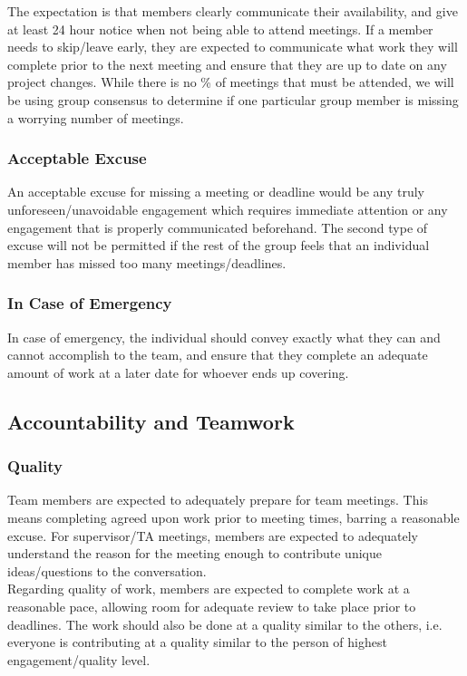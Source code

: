 \documentclass{article}
\begin{document}
The expectation is that members clearly communicate their availability,
and give at least 24 hour notice when not being able to attend meetings.
If a member needs to skip/leave early, they are expected to communicate 
what work they will complete prior to the next meeting and ensure that
they are up to date on any project changes. While there is no \% of
meetings that must be attended, we will be using group consensus to
determine if one particular group member is missing a worrying number
of meetings.

\subsubsection*{Acceptable Excuse}

An acceptable excuse for missing a meeting or deadline would be any truly
unforeseen/unavoidable engagement which requires immediate attention or any engagement 
that is properly communicated beforehand. The second type of excuse will not be 
permitted if the rest of the group feels that an individual member has missed too 
many meetings/deadlines.

\subsubsection*{In Case of Emergency}

In case of emergency, the individual should convey exactly what they can and cannot accomplish to
the team, and ensure that they complete an adequate amount of work at a later date 
for whoever ends up covering.

\subsection*{Accountability and Teamwork}

\subsubsection*{Quality}

Team members are expected to adequately prepare for team meetings. This means completing 
agreed upon work prior to meeting times, barring a reasonable excuse. For supervisor/TA
meetings, members are expected to adequately understand the reason for the meeting enough
to contribute unique ideas/questions to the conversation.\\ 

Regarding quality of work, members are expected to complete work at a reasonable pace, allowing room 
for adequate review to take place prior to deadlines. The work should also be done at a quality
similar to the others, i.e. everyone is contributing at a quality similar to the person of highest
engagement/quality level.
\end{document}
